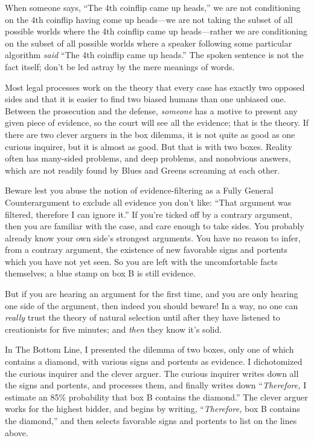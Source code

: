 {
 When someone says, ``The 4th coinflip came up
heads,'' we are not conditioning on the 4th coinflip
having come up heads---we are not taking the subset of all possible
worlds where the 4th coinflip came up heads---rather we are
conditioning on the subset of all possible worlds where a speaker
following some particular algorithm \textit{said}
``The 4th coinflip came up heads.''
The spoken sentence is not the fact itself; don't be
led astray by the mere meanings of words.}

{
 Most legal processes work on the theory that every case has
exactly two opposed sides and that it is easier to find two biased
humans than one unbiased one. Between the prosecution and the defense,
\textit{someone} has a motive to present any given piece of evidence,
so the court will see all the evidence; that is the theory. If there
are two clever arguers in the box dilemma, it is not quite as good as
one curious inquirer, but it is almost as good. But that is with two
boxes. Reality often has many-sided problems, and deep problems, and
nonobvious answers, which are not readily found by Blues and Greens
screaming at each other.}

{
 Beware lest you abuse the notion of evidence-filtering as a Fully
General Counterargument to exclude all evidence you
don't like: ``That argument was
filtered, therefore I can ignore it.'' If
you're ticked off by a contrary argument, then you are
familiar with the case, and care enough to take sides. You probably
already know your own side's strongest arguments. You
have no reason to infer, from a contrary argument, the existence of new
favorable signs and portents which you have not yet seen. So you are
left with the uncomfortable facts themselves; a blue stamp on box B is
still evidence.}

{
 But if you are hearing an argument for the first time, and you are
only hearing one side of the argument, then indeed you should beware!
In a way, no one can \textit{really} trust the theory of natural
selection until after they have listened to creationists for five
minutes; and \textit{then} they know it's solid.}

\myendsectiontext


{
 In The Bottom Line, I presented the dilemma of two boxes, only one
of which contains a diamond, with various signs and portents as
evidence. I dichotomized the curious inquirer and the clever arguer.
The curious inquirer writes down all the signs and portents, and
processes them, and finally writes down
``\textit{Therefore,} I estimate an 85\% probability
that box B contains the diamond.'' The clever arguer
works for the highest bidder, and begins by writing,
``\textit{Therefore,} box B contains the
diamond,'' and then selects favorable signs and
portents to list on the lines above. }

